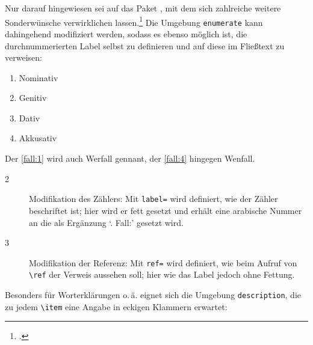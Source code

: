 
Nur darauf hingewiesen sei auf das Paket , mit dem sich zahlreiche 
weitere Sonderwünsche verwirklichen lassen.\footcite[304\psqq]{voss:einfuehrung}
Die Umgebung \lstinline/enumerate/  kann dahingehend modifiziert werden, sodass es ebenso möglich ist, 
die durchnummerierten Label selbst zu definieren
und auf diese im Fließtext zu verweisen:

\begin{example}
\begin{enumerate}[%
  label={\bfseries \arabic{*}. Fall:\ },
  ref={\arabic{*}. Fall}]
\item Nominativ \label{fall:1}
\item Genitiv\label{fall:2}
\item Dativ\label{fall:3}
\item Akkusativ\label{fall:4}
\end{enumerate}
Der \ref{fall:1} wird auch Werfall gennant,
der \ref{fall:4} hingegen Wenfall.
\end{example}

\begin{description}
 \item[2] Modifikation des Zählers: 
 Mit \lstinline/label=/ wird definiert,
 wie der Zähler beschriftet ist; hier wird er fett gesetzt und 
 erhält eine arabische Nummer an die als Ergänzung \enquote*{. Fall:} gesetzt wird.
  \item[3] Modifikation der Referenz: 
   Mit \lstinline/ref=/ wird definiert,
   wie beim Aufruf von \lstinline/\ref/ der Verweis aussehen soll;
   hier wie das Label jedoch ohne Fettung. 
 \end{description}
 \iffalse
 \begin{enumerate}[%
  label={\bfseries \arabic{*}. Fall:\ },
  ref={\arabic{*}. Fall}]
\item Nominativ \label{fall:1}
\item Genitiv\label{fall:2}
\item Dativ\label{fall:3}
\item Akkusativ\label{fall:4}
\end{enumerate}
Der \ref{fall:1} wird auch Werfall gennant,
der \ref{fall:4} hingegen Wenfall.
 \fi
{}

Besonders für Worterklärungen o.\,ä. eignet sich die Umgebung \lstinline/description/,
die zu jedem \lstinline/\item/  eine Angabe in eckigen Klammern erwartet:

